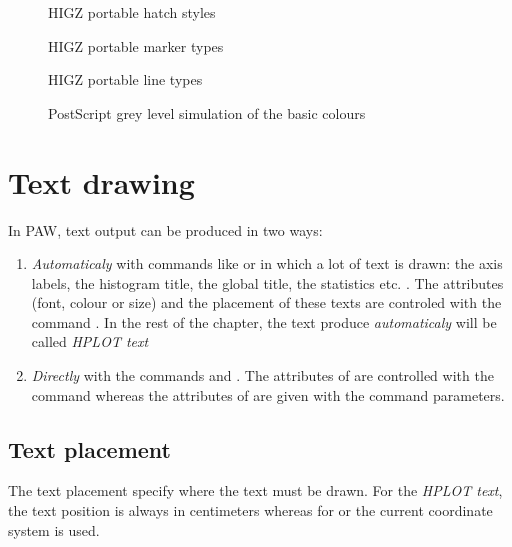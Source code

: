 \begin{figure}[p]
\begin{center}\mbox{}\end{center}
\caption{HIGZ portable hatch styles}
\label{fig:HATCH}
\end{figure}

\begin{figure}[p]
\begin{center}\mbox{}\end{center}
\caption{HIGZ portable marker types}
\label{fig:MTYPE}

\begin{center}\mbox{}\end{center}
\caption{HIGZ portable line types}
\label{fig:LTYPE}
\end{figure}

\begin{figure}
\caption{PostScript grey level simulation of the basic colours}
\label{fig:GREYLEV}
\end{figure}

\clearpage


\section{Text drawing}
In PAW, text output can be produced in two ways:
\begin{enumerate}
\item {\em Automaticaly} with commands like  or 
       in which a lot of text is drawn: the axis labels, the
      histogram title, the global title, the statistics etc. . The attributes
      (font, colour or size) and the placement of these texts are controled 
      with the command . In the rest of the chapter, the text
      produce {\em automaticaly} will be called {\em HPLOT text}
\item {\em Directly} with the commands  and . The 
      attributes of  are controlled with the command 
       whereas the attributes of  are given
      with the command parameters.
\end{enumerate}

\subsection*{Text placement}
The text placement specify where the text must be drawn. For the
{\em HPLOT text}, the text position  is always in centimeters whereas for
 or  the current coordinate system is used. 
